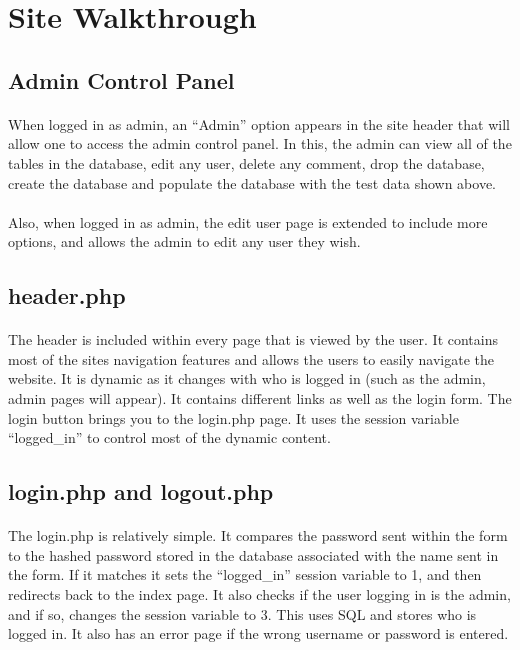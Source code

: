 \documentclass[11pt,letterpaper,titlepage]{article}
\begin{document}
    \section{Site Walkthrough}

    \subsection{Admin Control Panel}
    \paragraph{}
    When logged in as admin, an ``Admin'' option appears in the site header
    that will allow one to access the admin control panel. In this, the admin can
    view all of the tables in the database, edit any user, delete any comment,
    drop the database, create the database and populate the database with the
    test data shown above.

    \paragraph{}
    Also, when logged in as admin, the edit user page is extended to include
    more options, and allows the admin to edit any user they wish.


    \subsection{header.php}
    \paragraph{}
    The header is included within every page that is viewed by the user. It
    contains most of the sites navigation features and allows the users to
    easily navigate the website. It is dynamic as it changes with who is logged
    in (such as the admin, admin pages will appear). It contains different
    links as well as the login form. The login button brings you to the
    login.php page. It uses the session variable ``logged\_in'' to control most
    of the dynamic content.

    \subsection{login.php and logout.php}
    \paragraph{}
    The login.php is relatively simple. It compares the password sent within the
    form to the hashed password stored in the database associated with the name
    sent in the form. If it matches it sets the ``logged\_in'' session variable
    to 1, and then redirects back to the index page. It also checks if the user
    logging in is the admin, and if so, changes the session variable to 3. This
    uses SQL and stores who is logged in. It also has an error page if the wrong
    username or password is entered.
\end{document}
